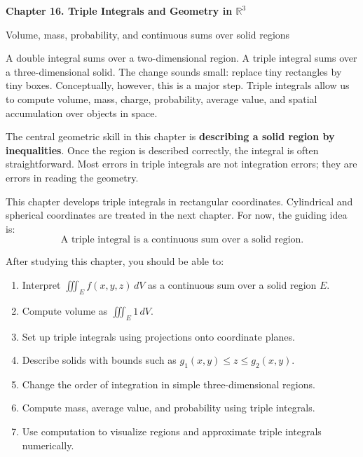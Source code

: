 \documentclass[11pt]{article}
\begin{document}
\begin{center}
  {\LARGE\bfseries Chapter 16. Triple Integrals and Geometry in $\mathbb R^3$\par}
  \vspace{0.3em}
  {\large Volume, mass, probability, and continuous sums over solid regions\par}
\end{center}

\begin{chapteroverviewbox}
A double integral sums over a two-dimensional region. A triple integral sums over a three-dimensional solid. The change sounds small: replace tiny rectangles by tiny boxes. Conceptually, however, this is a major step. Triple integrals allow us to compute volume, mass, charge, probability, average value, and spatial accumulation over objects in space.

The central geometric skill in this chapter is \textbf{describing a solid region by inequalities}. Once the region is described correctly, the integral is often straightforward. Most errors in triple integrals are not integration errors; they are errors in reading the geometry.

This chapter develops triple integrals in rectangular coordinates. Cylindrical and spherical coordinates are treated in the next chapter. For now, the guiding idea is:
\[
\boxed{\text{A triple integral is a continuous sum over a solid region.}}
\]
\end{chapteroverviewbox}

\begin{goalbox}
After studying this chapter, you should be able to:
\begin{enumerate}
  \item Interpret $\iiint_E f(x,y,z)\,dV$ as a continuous sum over a solid region $E$.
  \item Compute volume as $\iiint_E 1\,dV$.
  \item Set up triple integrals using projections onto coordinate planes.
  \item Describe solids with bounds such as $g_1(x,y)\le z\le g_2(x,y)$.
  \item Change the order of integration in simple three-dimensional regions.
  \item Compute mass, average value, and probability using triple integrals.
  \item Use computation to visualize regions and approximate triple integrals numerically.
\end{enumerate}
\end{goalbox}
\end{document}
